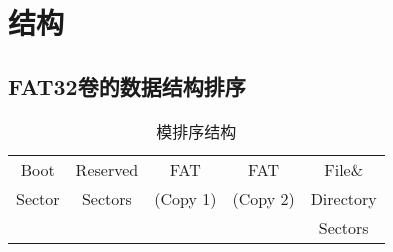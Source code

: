 \chapter{结构}

\section{FAT32卷的数据结构排序}





\begin{table}[htbp]
	\centering
	\caption[排序结构]{模排序结构}
	\begin{tabular}{ccccc}
	\hline
	Boot & Reserved & FAT & FAT & File\& \\
	Sector & Sectors & (Copy 1) & (Copy 2) & Directory \\
	& & & & Sectors \\
	\hline
	\end{tabular}
\end{table}

